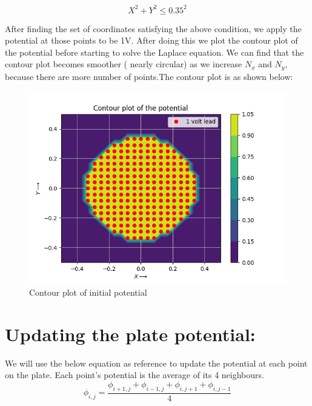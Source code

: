 \documentclass{article}
\begin{document}
\begin{equation}
X ^2 +Y ^2 \leq	 0.35^2
\end{equation}

After finding the set of coordinates satisfying the above condition, we
apply the potential at those points to be 1V. After doing this we plot the
contour plot of the potential before starting to solve the Laplace equation.\newline
We can find that the contour plot becomes smoother ( nearly circular) as we increase $N_x$ and $N_y$, because there are more number of points.\newline\newline\newline The contour plot is as shown below:\newline\newline
\clearpage

    \begin{figure}[!tbh]
        \centering
        \includegraphics[scale=0.8]{contour1.png}  
        \caption{Contour plot of initial potential}
   \end{figure}
   
 \section{Updating the plate potential:}
 We will use the below equation as reference to update the potential at each point on the plate.
 Each point's potential is the average of its 4 neighbours.
   \begin{equation}
           \phi_{i,j} = \frac{\phi_{i+1,j} + \phi_{i-1,j} + \phi_{i,j+1} + \phi_{i,j-1}}{4} 
   \end{equation}
   
\end{document}
